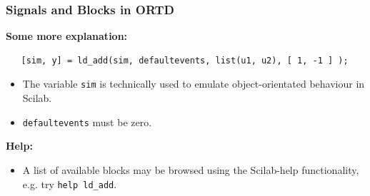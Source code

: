 \documentclass[serif,9pt,xcolor=dvipsnames]{beamer}
\begin{document}
\begin{frame}[fragile]
\frametitle{Signals and Blocks in ORTD}
 
 \textbf{Some more explanation:}

{\small 
\begin{lstlisting}
   [sim, y] = ld_add(sim, defaultevents, list(u1, u2), [ 1, -1 ] );
\end{lstlisting}}
 
 \begin{itemize}
   \item The variable \texttt{sim} is technically used to emulate object-orientated behaviour in Scilab.
   \item \texttt{defaultevents} must be zero.
 \end{itemize}

 \vspace{1.5cm}

\textbf{Help:}
 \begin{itemize}
  \item A list of available blocks may be browsed using the Scilab-help functionality, e.g. try \texttt{help ld\_add}.
 \end{itemize}
 

\end{frame}
\end{document}
